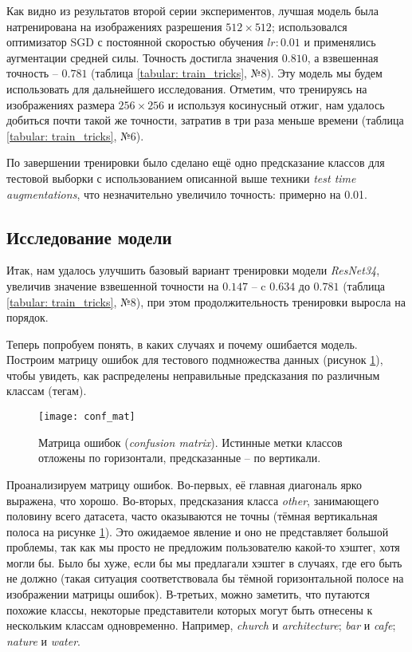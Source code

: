 \indent
\indent
Как видно из результатов второй серии экспериментов, лучшая модель
была натренирована на изображениях разрешения
$512 \times 512$; использовался
оптимизатор SGD с постоянной скоростью обучения $lr: 0.01$ и применялись
аугментации средней силы. Точность достигла значения $0.810$, а
взвешенная точность -- $0.781$ (таблица \ref{tabular: train_tricks}, №8).
Эту модель мы будем использовать для дальнейшего исследования.
Отметим, что тренируясь на изображениях размера $256 \times 256$ и 
используя косинусный отжиг, нам удалось добиться почти такой же точности,
затратив в три раза меньше времени (таблица \ref{tabular: train_tricks}, №6).


\indent
\indent
По завершении тренировки было сделано ещё одно предсказание классов
для тестовой выборки с использованием описанной выше техники
\textit{test time augmentations}, что незначительно увеличило
точность: примерно на 0.01.


\subsection{Исследование модели}


\indent
\indent
Итак, нам удалось улучшить базовый
вариант тренировки модели \textit{ResNet34},
увеличив значение взвешенной точности на $0.147$ -- 
 c $0.634$ до $0.781$ (таблица \ref{tabular: train_tricks}, №8), 
при этом продолжительность 
тренировки выросла на порядок.


\indent
\indent
Теперь попробуем понять, в каких случаях и почему
 ошибается модель. Построим матрицу ошибок
 для тестового подмножества данных
(рисунок \ref{tikzpicture: conf_mat}),
чтобы увидеть,  как распределены неправильные
предсказания по различным классам (тегам).


\begin{figure}[h!]
    \begin{center}
   	    \texttt{[image: conf\_mat]}
   	\end{center}
   	\caption{Матрица ошибок (\textit{confusion matrix}). Истинные метки 
   	               классов отложены по горизонтали, предсказанные -- по вертикали.}
   	\label{tikzpicture: conf_mat}
\end{figure}


\indent
\indent
Проанализируем матрицу ошибок.
Во-первых, её главная диагональ ярко выражена, что хорошо.
Во-вторых, предсказания класса \textit{other},
занимающего половину всего датасета, часто оказываются не 
точны (тёмная вертикальная полоса на рисунке \ref{tikzpicture: conf_mat}).
Это ожидаемое явление и оно не представляет большой проблемы, так как
мы просто не предложим пользователю какой-то хэштег, хотя могли бы.
Было бы хуже, если бы мы предлагали хэштег в случаях, где его 
быть не должно (такая ситуация соответствовала бы тёмной горизонтальной 
полосе на изображении матрицы ошибок).
В-третьих, можно заметить, что путаются похожие классы, 
некоторые представители
которых могут быть отнесены к нескольким классам одновременно.
Например, \textit{church} и \textit{architecture}; \textit{bar} и \textit{cafe};
\textit{nature} и \textit{water}.


